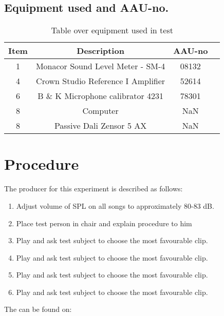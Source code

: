 \subsection*{Equipment used and AAU-no.}

\begin{table}[H]
\centering
{}
\begin{tabular}{S[table-format=1]ccc} \toprule
    {Item} & {Description} & {AAU-no} \\       &  Monacor Sound Level Meter - SM-4      & 08132   \\
    4      &  Crown Studio Reference I Amplifier    & 52614   \\
    6      &  B \& K Microphone calibrator 4231     & 78301   \\
    8      &  Computer                              & NaN     \\  
    8      &  Passive Dali Zensor 5 AX              & NaN     \\ \bottomrule 
\end{tabular}
\caption{Table over equipment used in test}
\label{tab:UsedEquipmentListning}
\end{table}



\section{Procedure}\label{sec:SpeakerTestProcedure3}

The producer for this experiment is described as follows:
\begin{enumerate}
\item Adjust volume of \gls{SPL} on all songs to approximately 80-83 dB.
\item Place test person in chair and explain procedure to him
\item Play  and ask test subject to choose the most favourable clip.
\item Play  and ask test subject to choose the most favourable clip.
\item Play  and ask test subject to choose the most favourable clip.
\item Play  and ask test subject to choose the most favourable clip.
\end{enumerate}

The  can be found on:\\
\\

